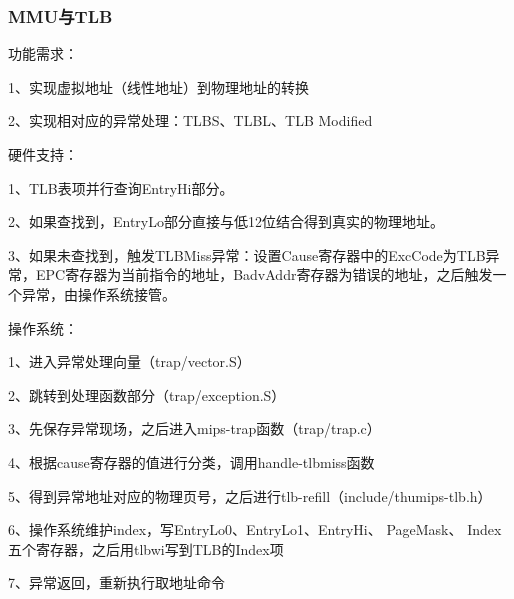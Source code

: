 \documentclass[12pt,a4paper]{article}
\begin{document}
\begin{CJK}{UTF8}{gbsn}
		\subsubsection{MMU与TLB}
			\begin{description*}
				\setlength{\itemsep}{1pt}
				\item[\quad 功能需求：]\hfill\par
					1、实现虚拟地址（线性地址）到物理地址的转换\par
					2、实现相对应的异常处理：TLBS、TLBL、TLB Modified
				\item[\quad 硬件支持：]\hfill\par
					1、TLB表项并行查询EntryHi部分。\par
					2、如果查找到，EntryLo部分直接与低12位结合得到真实的物理地址。\par
					3、如果未查找到，触发TLBMiss异常：设置Cause寄存器中的ExcCode为TLB异常，EPC寄存器为当前指令的地址，BadvAddr寄存器为错误的地址，之后触发一个异常，由操作系统接管。
				\item[\quad 操作系统：]\hfill\par
					1、进入异常处理向量（trap/vector.S）\par
					2、跳转到处理函数部分（trap/exception.S）\par
					3、先保存异常现场，之后进入mips-trap函数（trap/trap.c）\par
					4、根据cause寄存器的值进行分类，调用handle-tlbmiss函数\par
					5、得到异常地址对应的物理页号，之后进行tlb-refill（include/thumips-tlb.h）\par
					6、操作系统维护index，写EntryLo0、EntryLo1、EntryHi、 PageMask、 Index五个寄存器，之后用tlbwi写到TLB的Index项\par
					7、异常返回，重新执行取地址命令
			\end{description*}


\end{CJK}
\end{document}
